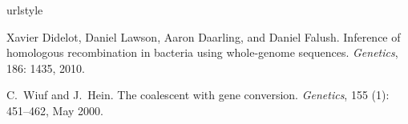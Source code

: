 \documentclass[a4paper,10pt]{article}
\begin{document}
\begin{thebibliography}{2}
\providecommand{\natexlab}[1]{#1}
\providecommand{\url}[1]{\texttt{#1}}
\expandafter\ifx\csname urlstyle\endcsname\relax
  \providecommand{\doi}[1]{doi: #1}\else
  \providecommand{\doi}{doi: \begingroup \urlstyle{rm}\Url}\fi

Xavier Didelot, Daniel Lawson, Aaron Daarling, and Daniel Falush.
\newblock Inference of homologous recombination in bacteria using whole-genome
  sequences.
\newblock \emph{Genetics}, 186: 1435, 2010.

C.~Wiuf and J.~Hein.
\newblock The coalescent with gene conversion.
\newblock \emph{Genetics}, 155 (1): 451--462, May 2000.

\end{thebibliography}
\end{document}
